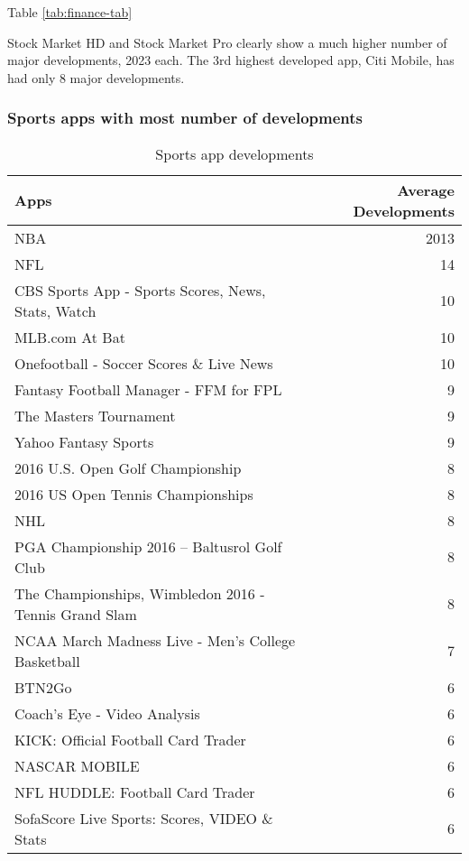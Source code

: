 \documentclass[
]{article}
\begin{document}
Table \ref{tab:finance-tab}

Stock Market HD and Stock Market Pro clearly show a much higher number of major developments, 2023 each. The 3rd highest developed app, Citi Mobile, has had only 8 major developments.

\hypertarget{sports-apps-with-most-number-of-developments}{%
\subsubsection{Sports apps with most number of developments}\label{sports-apps-with-most-number-of-developments}}

\begin{table}[!h]

\caption{\label{tab:sports-tab}Sports app developments}
\centering
\begin{tabular}[t]{l|r}
\hline
Apps & Average Developments\\
\hline
\rowcolor{gray!6}  NBA & 2013\\
\hline
NFL & 14\\
\hline
\rowcolor{gray!6}  CBS Sports App - Sports Scores, News, Stats, Watch & 10\\
\hline
MLB.com At Bat & 10\\
\hline
\rowcolor{gray!6}  Onefootball - Soccer Scores \& Live News & 10\\
\hline
Fantasy Football Manager - FFM for FPL & 9\\
\hline
\rowcolor{gray!6}  The Masters Tournament & 9\\
\hline
Yahoo Fantasy Sports & 9\\
\hline
\rowcolor{gray!6}  2016 U.S. Open Golf Championship & 8\\
\hline
2016 US Open Tennis Championships & 8\\
\hline
\rowcolor{gray!6}  NHL & 8\\
\hline
PGA Championship 2016 – Baltusrol Golf Club & 8\\
\hline
\rowcolor{gray!6}  The Championships, Wimbledon 2016 - Tennis Grand Slam & 8\\
\hline
NCAA March Madness Live - Men's College Basketball & 7\\
\hline
\rowcolor{gray!6}  BTN2Go & 6\\
\hline
Coach's Eye - Video Analysis & 6\\
\hline
\rowcolor{gray!6}  KICK: Official Football Card Trader & 6\\
\hline
NASCAR MOBILE & 6\\
\hline
\rowcolor{gray!6}  NFL HUDDLE: Football Card Trader & 6\\
\hline
SofaScore Live Sports: Scores, VIDEO \& Stats & 6\\
\hline
\end{tabular}
\end{table}
\end{document}
